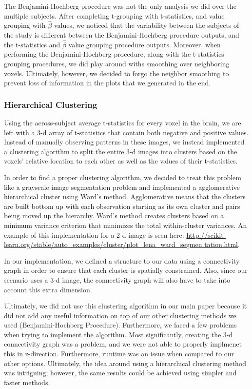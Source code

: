 \par The Benjamini-Hochberg procedure was not the only analysis we did over the
multiple subjects. After completing t-grouping with t-statistics, and value 
grouping with $\hat{\beta}$ values, we noticed that the variability between the
subjects of the study is different between the Benjamini-Hochberg procedure 
outputs, and the t-statistics and $\hat{\beta}$ value grouping procedure 
outputs. Moreover, when performing the Benjamini-Hochberg procedure, along with
the t-statistics grouping procedures, we did play around withs smoothing over 
neighboring voxels. Ultimately, however, we decided to forgo the neighbor 
smoothing to prevent loss of information in the plots that we generated in the 
end.

\subsubsection{Hierarchical Clustering}

\par Using the across-subject average t-statistics for every voxel in the
brain, we are left with a 3-d array of t-statistics that contain both negative
and positive values. Instead of manually observing patterns in these images, we
instead implemented a clustering algorithm to split the entire 3-d images into
clusters based on the voxels' relative location to each other as well as the
values of their t-statistics.

\par In order to find a proper clustering algorithm, we decided to treat this
problem like a grayscale image segmentation problem and implemented a
agglomerative hierarchical cluster using Ward's method. Agglomerative means
that the clusters are built bottom up with each observation starting as its
own cluster and pairs being moved up the hierarchy. Ward's method creates
clusters based on a minimum variance criterion that minimizes the total
within-cluster variances. An example of this implementation for a 2-d image is
seen here: 
\url{http://scikit-learn.org/stable/auto_examples/cluster/plot_lena_ward_segmen
tation.html}.

In our implementation, we defined a structure to our data using a connectivity
graph in order to ensure that each cluster is spatially constrained. Also,
since our scenario uses a 3-d image, the connectivity graph will also have to
take into account this extra dimension.

\par Ultimately, we did not use this clustering algorithm in our main paper
because it did not add any useful information on top of our other clustering
methods we used (Benjamini-Hochberg Procedure). Furthermore, we faced a few
problems when trying to implement the algorithm. Most significantly, creating
the 3-d connectivity graph was a problem, and we were not able to properly
implmenet this in z-direction. Furthermore, runtime was an issue when compared
to our other options. Ultimately, the idea around using a hierarchical
clustering method was intriguing; however, the same results could be achieved
using simpler and faster methods.

